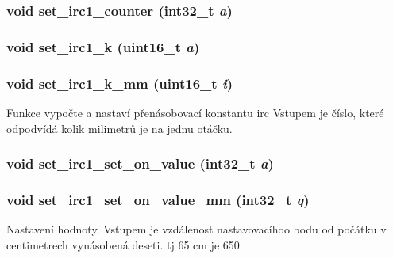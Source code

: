 \subsubsection[{set\_\-irc1\_\-counter}]{\setlength{\rightskip}{0pt plus 5cm}void set\_\-irc1\_\-counter (int32\_\-t {\em a})}\label{irc_8h_aa80a7e95233446dac8df1c9d8f4c263a}
\subsubsection[{set\_\-irc1\_\-k}]{\setlength{\rightskip}{0pt plus 5cm}void set\_\-irc1\_\-k (uint16\_\-t {\em a})}\label{irc_8h_a478355ecd82c2b5e54b93297b402f95f}
\subsubsection[{set\_\-irc1\_\-k\_\-mm}]{\setlength{\rightskip}{0pt plus 5cm}void set\_\-irc1\_\-k\_\-mm (uint16\_\-t {\em i})}\label{irc_8h_a34cbf3086c85ee2ee639c6e85feeb848}
Funkce vypočte a nastaví přenásobovací konstantu irc Vstupem je číslo, které odpodvídá kolik milimetrů je na jednu otáčku. 
\subsubsection[{set\_\-irc1\_\-set\_\-on\_\-value}]{\setlength{\rightskip}{0pt plus 5cm}void set\_\-irc1\_\-set\_\-on\_\-value (int32\_\-t {\em a})}\label{irc_8h_a3515c748a2972e9aa03800b29050ee88}
\subsubsection[{set\_\-irc1\_\-set\_\-on\_\-value\_\-mm}]{\setlength{\rightskip}{0pt plus 5cm}void set\_\-irc1\_\-set\_\-on\_\-value\_\-mm (int32\_\-t {\em q})}\label{irc_8h_afc8d405aa96a15f9304139867b024361}
Nastavení hodnoty. Vstupem je vzdálenost nastavovacíhoo bodu od počátku v centimetrech vynásobená deseti. tj 65 cm je 650 